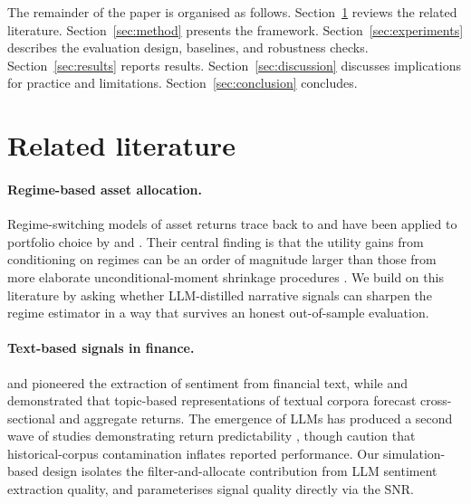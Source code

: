 \documentclass[review,12pt,authoryear]{elsarticle}
\begin{document}
The remainder of the paper is organised as follows. Section~\ref{sec:litreview} reviews the
related literature. Section~\ref{sec:method} presents the framework. Section~\ref{sec:experiments}
describes the evaluation design, baselines, and robustness checks. Section~\ref{sec:results}
reports results. Section~\ref{sec:discussion} discusses implications for practice and
limitations. Section~\ref{sec:conclusion} concludes.

\section{Related literature}
\label{sec:litreview}

\paragraph{Regime-based asset allocation.}
Regime-switching models of asset returns trace back to \citet{Hamilton1989} and have been
applied to portfolio choice by \citet{Ang2002RegimeSwitching} and
\citet{GuidolinTimmermann2007}. Their central finding is that the utility gains from
conditioning on regimes can be an order of magnitude larger than those from more elaborate
unconditional-moment shrinkage procedures \citep{WolfLedoit2004,DeMiguel2009}. We build on
this literature by asking whether LLM-distilled narrative signals can sharpen the
regime estimator in a way that survives an honest out-of-sample evaluation.

\paragraph{Text-based signals in finance.}
\citet{TetlockSaar2008} and \citet{Loughran2011} pioneered the extraction of sentiment from
financial text, while \citet{Ke2019PredictingReturns} and \citet{BybeeEtAl2024} demonstrated
that topic-based representations of textual corpora forecast cross-sectional and aggregate
returns. The emergence of LLMs \citep{Brown2020GPT3} has produced a second wave of studies
demonstrating return predictability \citep{LopezLira2023,Jiang2023FinGPT}, though
\citet{Glasserman2023LookAhead} caution that historical-corpus contamination inflates
reported performance. Our simulation-based design isolates the filter-and-allocate
contribution from LLM sentiment extraction quality, and parameterises signal quality
directly via the SNR.
\end{document}
